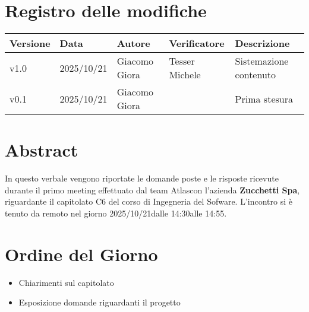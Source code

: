 \documentclass[a4paper,12pt]{article}
\newcommand{\Gruppo}{Atlas}
\newcommand{\DataVerbale}{2025/10/21}
\newcommand{\OraInizio}{14:30}
\newcommand{\OraFine}{14:55}
\newcommand{\AbstractVerbale}{%
In questo verbale vengono riportate le domande poste e le risposte ricevute durante il primo meeting effettuato dal team \Gruppo \space con l'azienda \textbf{Zucchetti Spa}, riguardante il capitolato C6 del corso di Ingegneria del Sofware. L'incontro si è tenuto da remoto nel giorno \DataVerbale \space dalle \OraInizio \space alle \OraFine.
}
\newcommand{\VersioneVerbale}{v1.0} %
\begin{document}
\section*{Registro delle modifiche}{
    \begin{center} 
        \begin{tabular}{|l|l|l|l|l|}
            \hline
            \textbf{Versione} & \textbf{Data} & \textbf{Autore} & \textbf{Verificatore} & \textbf{Descrizione} \\
            \hline
            \VersioneVerbale & 2025/10/21 & Giacomo Giora & Tesser Michele & Sistemazione contenuto\\ 
            \hline
            v0.1 & 2025/10/21 & Giacomo Giora &  & Prima stesura\\ 
            \hline
       \end{tabular}
    \end{center}
}

\newpage

\tableofcontents

\newpage
\section{Abstract}{
    \begin{minipage}{0.9\textwidth}
        \small
        \AbstractVerbale
    \end{minipage}
}


\section{Ordine del Giorno}{
    \begin{itemize}
        \item Chiarimenti sul capitolato
        \item Esposizione domande riguardanti il progetto
    \end{itemize}
}
\end{document}
